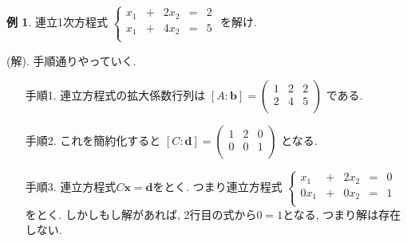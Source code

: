 \documentclass[dvipdfmx,a4paper,11pt]{article}
\theoremstyle{definition}
\newtheorem{exa}[thm]{例}
\begin{document}
\begin{exa}
連立1次方程式
 $
 \left\{ 
\begin{matrix}
x_1&+&2x_2& = &2 \\
x_1&+&4x_2& = &5\\
\end{matrix}
\right.
 $
 を解け.
 
 (解). 手順通りやっていく. 
  \begin{enumerate}
 	\setlength{\parskip}{0cm}
  	\setlength{\itemsep}{0pt} 
 \item[手順1.]  連立方程式の拡大係数行列は
 $[A:\bm{b}]=
  \begin{pmatrix}
 1& 2& 2  \\
 2& 4& 5  \\
 \end{pmatrix}
 $
 である. 
  \item[手順2.] これを簡約化すると
 $[C:\bm{d}] =
  \begin{pmatrix}
 1& 2& 0  \\
 0& 0& 1 \\
 \end{pmatrix} 
 $
 となる. 
  \item[手順3.] 連立方程式$C\bm{x} =\bm{d}$をとく. つまり連立方程式
 $
  \left\{ 
\begin{matrix}
x_1&+&2x_2& = &0 \\
0x_1&+&0x_2& = &1\\
\end{matrix}
\right.
$
をとく.  しかしもし解があれば, 2行目の式から$0=1$となる, つまり解は存在しない.
\end{enumerate}
\end{exa}
\end{document}
